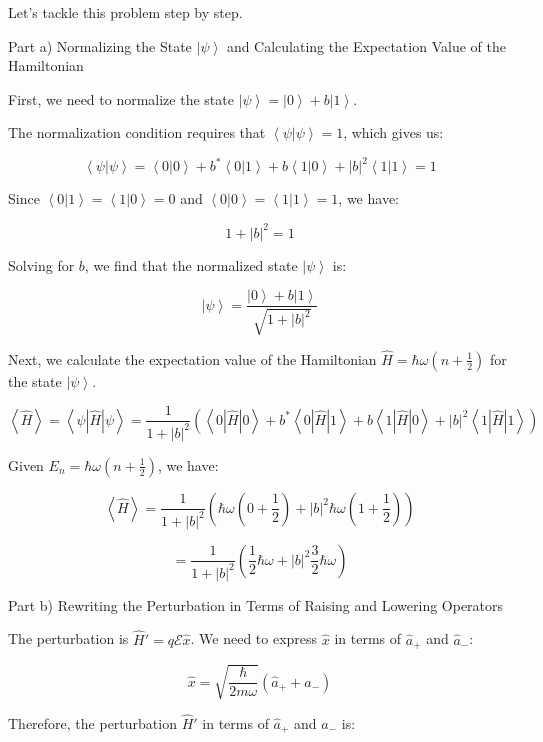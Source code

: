 \documentclass[a4paper,11pt]{article}
\begin{document}
Let's tackle this problem step by step.

Part a) Normalizing the State \( \left| \psi \right> \) and Calculating the Expectation Value of the Hamiltonian

First, we need to normalize the state \( \left| \psi \right> = \left| 0 \right> + b \left| 1 \right> \).

The normalization condition requires that \( \left< \psi | \psi \right> = 1 \), which gives us:

\[ \left< \psi | \psi \right> = \left< 0 | 0 \right> + b^* \left< 0 | 1 \right> + b \left< 1 | 0 \right> + |b|^2 \left< 1 | 1 \right> = 1 \]

Since \( \left< 0 | 1 \right> = \left< 1 | 0 \right> = 0 \) and \( \left< 0 | 0 \right> = \left< 1 | 1 \right> = 1 \), we have:

\[ 1 + |b|^2 = 1 \]

Solving for \( b \), we find that the normalized state \( \left| \psi \right> \) is:

\[ \left| \psi \right> = \frac{\left| 0 \right> + b \left| 1 \right>}{\sqrt{1 + |b|^2}} \]

Next, we calculate the expectation value of the Hamiltonian \( \hat{H} = \hbar\omega(n+\frac{1}{2}) \) for the state \( \left| \psi \right> \).

\[ \left< \hat{H} \right> = \left< \psi | \hat{H} | \psi \right> = \frac{1}{1+|b|^2} \left( \left< 0 | \hat{H} | 0 \right> + b^* \left< 0 | \hat{H} | 1 \right> + b \left< 1 | \hat{H} | 0 \right> + |b|^2 \left< 1 | \hat{H} | 1 \right> \right) \]

Given \( E_{n} = \hbar\omega(n+\frac{1}{2}) \), we have:

\[ \left< \hat{H} \right> = \frac{1}{1+|b|^2} \left( \hbar\omega(0+\frac{1}{2}) + |b|^2\hbar\omega(1+\frac{1}{2}) \right) \]

\[ = \frac{1}{1+|b|^2} \left( \frac{1}{2}\hbar\omega + |b|^2\frac{3}{2}\hbar\omega \right) \]

Part b) Rewriting the Perturbation in Terms of Raising and Lowering Operators

The perturbation is \( \hat{H}' = q \mathcal{E} \hat{x} \). We need to express \( \hat{x} \) in terms of \( \hat{a}_{+} \) and \( \hat{a}_{-} \):

\[ \hat{x} = \sqrt{\frac{\hbar}{2m\omega}}(\hat{a}_{+} + \hat{a}_{-}) \]

Therefore, the perturbation \( \hat{H}' \) in terms of \( \hat{a}_{+} \) and \( \hat{a}_{-} \) is:
\end{document}

